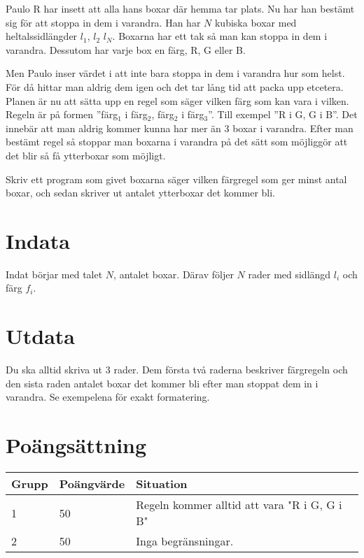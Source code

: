 
Paulo R har insett att alla hans boxar där hemma tar plats. Nu har han bestämt
sig för att stoppa in dem i varandra. Han har $N$ kubiska boxar med
heltalssidlängder $l_1$, $l_2$ \ellipsis $l_N$. Boxarna har ett tak så man kan stoppa in
dem i varandra. Dessutom har varje box en färg, R, G eller B.

Men Paulo inser värdet i att inte bara stoppa in dem i varandra hur som helst.
För då hittar man aldrig dem igen och det tar lång tid att packa upp etcetera.
Planen är nu att sätta upp en regel som säger vilken färg som kan vara i
vilken. Regeln är på formen ''färg$_1$ i färg$_2$, färg$_2$ i färg$_3$''. Till exempel ''R i
G, G i B''. Det innebär att man aldrig kommer kunna har mer än 3 boxar i
varandra. Efter man bestämt regel så stoppar man boxarna i varandra på det sätt
som möjliggör att det blir så få ytterboxar som möjligt.

Skriv ett program som givet boxarna säger vilken färgregel som ger minst antal
boxar, och sedan skriver ut antalet ytterboxar det kommer bli.

\section*{Indata}

Indat börjar med talet $N$, antalet boxar. Därav följer $N$ rader med sidlängd
$l_i$ och färg $f_i$.

\section*{Utdata}

Du ska alltid skriva ut 3 rader. Dem första två raderna beskriver färgregeln
och den sista raden antalet boxar det kommer bli efter man stoppat dem in i
varandra. Se exempelena för exakt formatering.

\section*{Poängsättning}

\begin{tabular}{| l | l | l |}
\hline
Grupp & Poängvärde & Situation \\ \hline
1     & 50         & Regeln kommer alltid att vara "R i G, G i B" \\ \hline
2     & 50         & Inga begränsningar. \\ \hline
\end{tabular}
